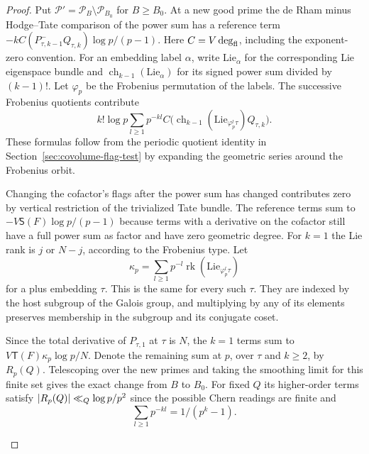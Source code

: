 \begin{proof}
Put \(\mathcal P'=\mathcal P_B\setminus\mathcal P_{B_0}\) for
\(B\ge B_0\). At a new good prime the de Rham minus Hodge--Tate
comparison of the power sum has a reference term
\(-k C(P^-_{\tau,k-1}Q_{\tau,k})\log p/(p-1)\).
Here \(C=V\deg_{\rm fl}\), including the exponent-zero convention.
For an embedding label \(\alpha\), write \(\mathrm{Lie}_\alpha\) for the corresponding Lie eigenspace bundle and \(\operatorname{ch}_{k-1}(\mathrm{Lie}_\alpha)\) for its signed power sum divided by \((k-1)!\). Let \(\varphi_p\) be the Frobenius permutation of the labels. The successive Frobenius quotients contribute
\[
 k!\log p\sum_{l\ge1}p^{-kl}
 C\big(\operatorname{ch}_{k-1}(\mathrm{Lie}_{\varphi_p^l\tau})
                                      Q_{\tau,k}\big).
\]
These formulas follow from the periodic quotient
identity in Section~\ref{sec:covolume-flag-test} by expanding the
geometric series around the Frobenius orbit.

Changing the
cofactor's flags after the power sum has changed contributes zero
by vertical restriction of the trivialized Tate bundle.
The reference terms sum to \(-V\mathsf S(F)\log p/(p-1)\) because
terms with a derivative on the cofactor still have a full power
sum as factor and have zero geometric degree. For \(k=1\) the
Lie rank is \(j\) or \(N-j\), according to the Frobenius type.
Let
\[
 \kappa_p=\sum_{l\ge1}p^{-l}\operatorname{rk}(\mathrm{Lie}_{\varphi_p^l\tau})
\]
for a plus embedding \(\tau\).
This is the same for every such \(\tau\). They are indexed by
the host subgroup of the Galois group, and multiplying by any
of its elements preserves membership in the subgroup and its
conjugate coset.

Since the total derivative of \(P_{\tau,1}\)
at \(\tau\) is \(N\), the \(k=1\) terms sum to
\(V\mathsf T(F)\kappa_p\log p/N\). Denote the remaining sum at
\(p\), over \(\tau\) and \(k\ge2\), by \(R_p(Q)\).
Telescoping over the new primes and taking the smoothing limit
for this finite set gives the exact change from \(B\) to \(B_0\).
For fixed \(Q\) its higher-order terms satisfy
\(\lvert R_p(Q)\rvert\ll_Q \log p/p^2\) since the possible Chern
readings are finite and
\[
 \sum_{l\ge1}p^{-kl}=1/(p^k-1).
\]

\label{cor:covolume-wall-shape-4}


\end{proof}
